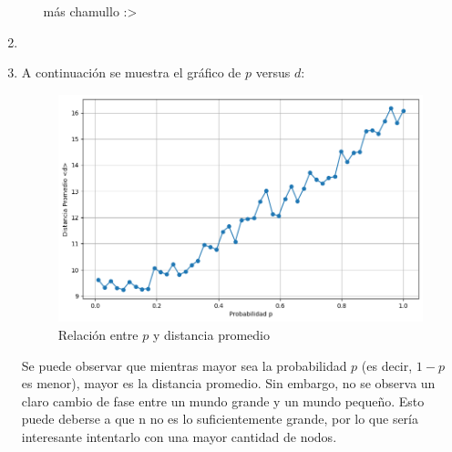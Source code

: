 \documentclass[12pt]{article}
\begin{document}
\begin{enumerate}
\begin{enumerate}
        más chamullo :>
    \end{enumerate}
    \item 
    \item A continuación se muestra el gráfico de $p$ versus $d$:
    \begin{figure}[H]
        \centering
        \includegraphics[scale=0.5]{images/grafico_p8.png}
        \caption{Relación entre $p$ y distancia promedio}
        \label{fig:graph_p}
    \end{figure}
    Se puede observar que mientras mayor sea la probabilidad $p$ (es decir, $1-p$ es menor), mayor es la distancia promedio. Sin embargo, no se observa un claro cambio de fase entre un mundo grande y un mundo pequeño. Esto puede deberse a que n no es lo suficientemente grande, por lo que sería interesante intentarlo con una mayor cantidad de nodos.
\end{enumerate}
\end{document}
